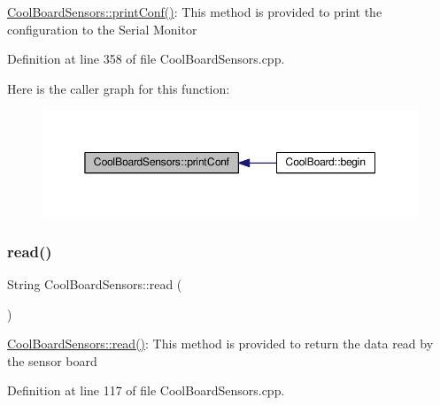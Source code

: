 \hyperlink{class_cool_board_sensors_af6fd79505815b204c178617ecf54c873}{Cool\+Board\+Sensors\+::print\+Conf()}\+: This method is provided to print the configuration to the Serial Monitor 

Definition at line 358 of file Cool\+Board\+Sensors.\+cpp.

Here is the caller graph for this function\+:\nopagebreak
\begin{figure}[H]
\begin{center}
\leavevmode
\includegraphics[width=350pt]{class_cool_board_sensors_af6fd79505815b204c178617ecf54c873_icgraph}
\end{center}
\end{figure}
\mbox{\label{class_cool_board_sensors_a91badb2539d91fda8679f2a597874c48}} 
\subsubsection{\texorpdfstring{read()}{read()}}
{\footnotesize\ttfamily String Cool\+Board\+Sensors\+::read (\begin{DoxyParamCaption}{ }\end{DoxyParamCaption})}

\hyperlink{class_cool_board_sensors_a91badb2539d91fda8679f2a597874c48}{Cool\+Board\+Sensors\+::read()}\+: This method is provided to return the data read by the sensor board 

Definition at line 117 of file Cool\+Board\+Sensors.\+cpp.

